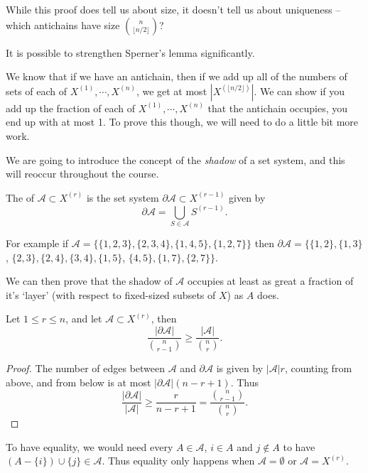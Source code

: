 \documentclass[a4paper]{scrartcl}
\newcommand{\A}{\mathcal{A}}
\begin{document}
\begin{remark}
    While this proof does tell us about size, it doesn't tell us about uniqueness -- which antichains have size $\binom{n}{\lfloor n/2 \rfloor}$?
\end{remark}

It is possible to strengthen Sperner's lemma significantly. 

We know that if we have an antichain, then if we add up all of the numbers of sets of each of $X^{(1)}, \cdots, X^{(n)}$, we get at most $|X^{(\lfloor n/2 \rfloor)}|$. We can show if you add up the fraction of each of $X^{(1)}, \cdots, X^{(n)}$ that the antichain occupies, you end up with at most 1.
To prove this though, we will need to do a little bit more work.

We are going to introduce the concept of the \emph{shadow} of a set system, and this will reoccur throughout the course.

\begin{definition}[Shadow]
    The  of $\A \subset X^{(r)}$ is the set system $\partial \A \subset X^{(r - 1)}$ given by 
    $$
    \partial \A = \bigcup_{S \in \A} S^{(r - 1)}.
    $$
\end{definition}

For example if $\A = \{\{1,2,3\}, \{2, 3, 4\}, \{1, 4, 5\}, \{1, 2, 7\}\}$ then $\partial \A = \{\{1, 2\}, \{1, 3\}$, $\{2, 3\}, \{2, 4\}, \{3, 4\}, \{1, 5\}$, $\{4, 5\}, \{1, 7\}, \{2, 7\}\}$.

We can then prove that the shadow of $\A$ occupies at least as great a fraction of it's `layer' (with respect to fixed-sized subsets of $X$) as $A$ does.

\begin{lemma}
    Let $1 \leq r \leq n$, and let $\A \subset X^{(r)}$, then 
    $$
    \frac{|\partial \A|}{\binom{n}{r - 1}} \geq \frac{|\A|}{\binom{n}{r}}.
    $$
\end{lemma}
\begin{proof}
    The number of edges between $\A$ and $\partial \A$ is given by $|\A| r$, counting from above, and from below is at most $|\partial \A|(n - r + 1)$. Thus
    $$
    \frac{|\partial \A|}{|\A|} \geq \frac{r}{n - r + 1} = \frac{\binom{n}{r-1}}{\binom{n}{r}}.
    $$
\end{proof}

To have equality, we would need every $A \in \A$, $i \in A$ and $j \not \in A$ to have $(A - \{i\}) \cup \{j\} \in \A$. Thus equality only happens when $\A = \emptyset$ or $\A = X^{(r)}$.
\end{document}
